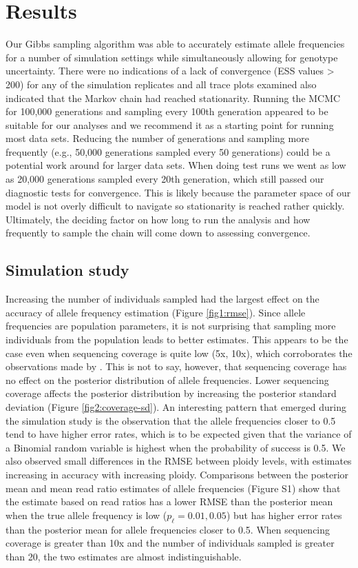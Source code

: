 \documentclass[11pt,english,letterpaper,oneside]{article}
\begin{document}
\section{Results}         %

Our Gibbs sampling algorithm was able to accurately estimate allele frequencies for a number of simulation settings while simultaneously allowing for genotype uncertainty. There were no indications of a lack of convergence (ESS values > 200) for any of the simulation replicates and all trace plots examined also indicated that the Markov chain had reached stationarity. Running the MCMC for 100,000 generations and sampling every 100th generation appeared to be suitable for our analyses and we recommend it as a starting point for running most data sets. Reducing the number of generations and sampling more frequently (e.g., 50,000 generations sampled every 50 generations) could be a potential work around for larger data sets. When doing test runs we went as low as 20,000 generations sampled every 20th generation, which still passed our diagnostic tests for convergence. This is likely because the parameter space of our model is not overly difficult to navigate so stationarity is reached rather quickly. Ultimately, the deciding factor on how long to run the analysis and how frequently to sample the chain will come down to assessing convergence.

\medskip
\subsection{Simulation study}
\medskip

Increasing the number of individuals sampled had the largest effect on the accuracy of allele frequency estimation (Figure \ref{fig1:rmse}). Since allele frequencies are population parameters, it is not surprising that sampling more individuals from the population leads to better estimates. This appears to be the case even when sequencing coverage is quite low (5x, 10x), which corroborates the observations made by \cite{buerkle2013popModels}. This is not to say, however, that sequencing coverage has no effect on the posterior distribution of allele frequencies. Lower sequencing coverage affects the posterior distribution by increasing the posterior standard deviation (Figure \ref{fig2:coverage-sd}). An interesting pattern that emerged during the simulation study is the observation that the allele frequencies closer to 0.5 tend to have higher error rates, which is to be expected given that the variance of a Binomial random variable is highest when the probability of success is 0.5. We also observed small differences in the RMSE between ploidy levels, with estimates increasing in accuracy with increasing ploidy. Comparisons between the posterior mean and mean read ratio estimates of allele frequencies (Figure S1) show that the estimate based on read ratios has a lower RMSE than the posterior mean when the true allele frequency is low ($p_\ell=0.01, 0.05$) but has higher error rates than the posterior mean for allele frequencies closer to 0.5. When sequencing coverage is greater than 10x and the number of individuals sampled is greater than 20, the two estimates are almost indistinguishable.
\end{document}
